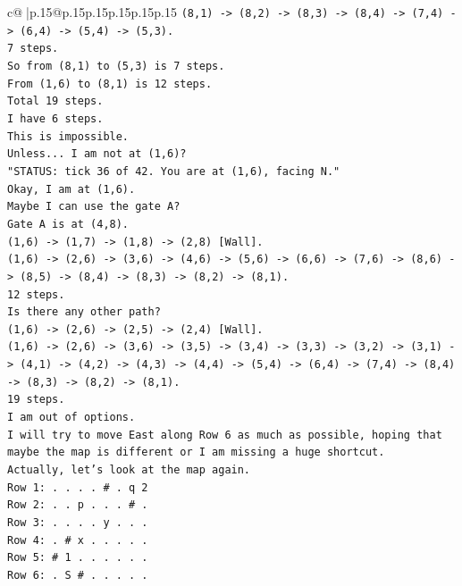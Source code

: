 \documentclass{article}
\begin{document}
{\begin{supertabular}{c@{$\;$}|p{.15\linewidth}@{}p{.15\linewidth}p{.15\linewidth}p{.15\linewidth}p{.15\linewidth}p{.15\linewidth}}
{{{\texttt{(8,1) {-}> (8,2) {-}> (8,3) {-}> (8,4) {-}> (7,4) {-}> (6,4) {-}> (5,4) {-}> (5,3).} \\
\texttt{7 steps.} \\
\texttt{So from (8,1) to (5,3) is 7 steps.} \\
\texttt{From (1,6) to (8,1) is 12 steps.} \\
\texttt{Total 19 steps.} \\
\texttt{I have 6 steps.} \\
\texttt{This is impossible.} \\
\texttt{Unless... I am not at (1,6)?} \\
\texttt{"STATUS: tick 36 of 42. You are at (1,6), facing N."} \\
\texttt{Okay, I am at (1,6).} \\
\texttt{Maybe I can use the gate A?} \\
\texttt{Gate A is at (4,8).} \\
\texttt{(1,6) {-}> (1,7) {-}> (1,8) {-}> (2,8) {[}Wall{]}.} \\
\texttt{(1,6) {-}> (2,6) {-}> (3,6) {-}> (4,6) {-}> (5,6) {-}> (6,6) {-}> (7,6) {-}> (8,6) {-}> (8,5) {-}> (8,4) {-}> (8,3) {-}> (8,2) {-}> (8,1).} \\
\texttt{12 steps.} \\
\texttt{Is there any other path?} \\
\texttt{(1,6) {-}> (2,6) {-}> (2,5) {-}> (2,4) {[}Wall{]}.} \\
\texttt{(1,6) {-}> (2,6) {-}> (3,6) {-}> (3,5) {-}> (3,4) {-}> (3,3) {-}> (3,2) {-}> (3,1) {-}> (4,1) {-}> (4,2) {-}> (4,3) {-}> (4,4) {-}> (5,4) {-}> (6,4) {-}> (7,4) {-}> (8,4) {-}> (8,3) {-}> (8,2) {-}> (8,1).} \\
\texttt{19 steps.} \\
\texttt{I am out of options.} \\
\texttt{I will try to move East along Row 6 as much as possible, hoping that maybe the map is different or I am missing a huge shortcut.} \\
\texttt{Actually, let's look at the map again.} \\
\texttt{Row 1: . . . . \# . q 2} \\
\texttt{Row 2: . . p . . . \# .} \\
\texttt{Row 3: . . . . y . . .} \\
\texttt{Row 4: . \# x . . . . .} \\
\texttt{Row 5: \# 1 . . . . . .} \\
\texttt{Row 6: . S \# . . . . .} \\
}}}
\end{supertabular}}
\end{document}
